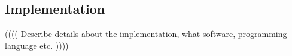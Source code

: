 \subsection{Implementation} %
\label{sub:implementation}

(((( Describe details about the implementation, what software, programming language etc. ))))



%




%	
